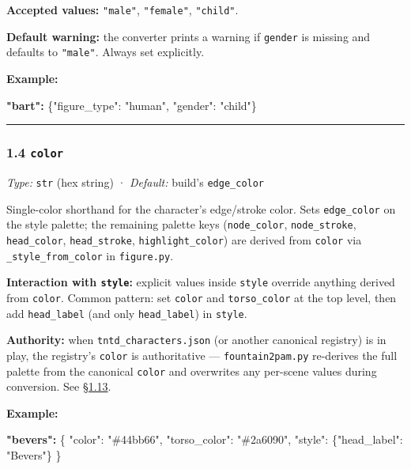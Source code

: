 \documentclass[
  11pt,
]{book}
\newenvironment{Shaded}{}{}
\newcommand{\DataTypeTok}[1]{\textcolor[rgb]{0.56,0.13,0.00}{#1}}
\newcommand{\ErrorTok}[1]{\textcolor[rgb]{1.00,0.00,0.00}{\textbf{#1}}}
\newcommand{\FunctionTok}[1]{\textcolor[rgb]{0.02,0.16,0.49}{#1}}
\newcommand{\StringTok}[1]{\textcolor[rgb]{0.25,0.44,0.63}{#1}}
\begin{document}
\textbf{Accepted values:} \texttt{"male"}, \texttt{"female"},
\texttt{"child"}.

\textbf{Default warning:} the converter prints a warning if
\texttt{gender} is missing and defaults to \texttt{"male"}. Always set
explicitly.

\textbf{Example:}

\begin{Shaded}
\begin{Highlighting}[]
\ErrorTok{"bart":} \FunctionTok{\{}\DataTypeTok{"figure\_type"}\FunctionTok{:} \StringTok{"human"}\FunctionTok{,} \DataTypeTok{"gender"}\FunctionTok{:} \StringTok{"child"}\FunctionTok{\}}
\end{Highlighting}
\end{Shaded}

\begin{center}\rule{0.5\linewidth}{0.5pt}\end{center}

\subsubsection{\texorpdfstring{1.4
\texttt{color}}{1.4 color}}\label{color}

\emph{Type:} \texttt{str} (hex string) · \emph{Default:} build's
\texttt{edge\_color}

Single-color shorthand for the character's edge/stroke color. Sets
\texttt{edge\_color} on the style palette; the remaining palette keys
(\texttt{node\_color}, \texttt{node\_stroke}, \texttt{head\_color},
\texttt{head\_stroke}, \texttt{highlight\_color}) are derived from
\texttt{color} via \texttt{\_style\_from\_color} in \texttt{figure.py}.

\textbf{Interaction with \texttt{style}:} explicit values inside
\texttt{style} override anything derived from \texttt{color}. Common
pattern: set \texttt{color} and \texttt{torso\_color} at the top level,
then add \texttt{head\_label} (and only \texttt{head\_label}) in
\texttt{style}.

\textbf{Authority:} when \texttt{tntd\_characters.json} (or another
canonical registry) is in play, the registry's \texttt{color} is
authoritative --- \texttt{fountain2pam.py} re-derives the full palette
from the canonical \texttt{color} and overwrites any per-scene values
during conversion. See
\hyperref[113-field-precedence-and-the-canonical-registry]{§1.13}.

\textbf{Example:}

\begin{Shaded}
\begin{Highlighting}[]
\ErrorTok{"bevers":} \FunctionTok{\{}
  \DataTypeTok{"color"}\FunctionTok{:} \StringTok{"\#44bb66"}\FunctionTok{,}
  \DataTypeTok{"torso\_color"}\FunctionTok{:} \StringTok{"\#2a6090"}\FunctionTok{,}
  \DataTypeTok{"style"}\FunctionTok{:} \FunctionTok{\{}\DataTypeTok{"head\_label"}\FunctionTok{:} \StringTok{"Bevers"}\FunctionTok{\}}
\FunctionTok{\}}
\end{Highlighting}
\end{Shaded}
\end{document}
